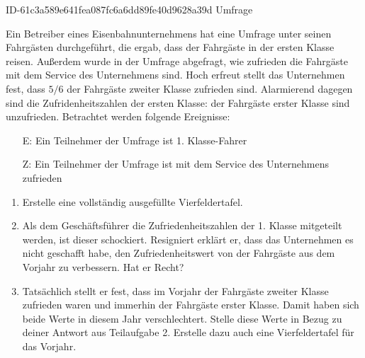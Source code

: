 \begin{exercise}
      {ID-61c3a589e641fea087fc6a6dd89fe40d9628a39d}
      {Umfrage}
  \ifproblem\problem\par
    Ein Betreiber eines Eisenbahnunternehmens hat eine Umfrage unter
    seinen Fahrgästen durchgeführt, die ergab, dass  der Fahrgäste
    in der ersten Klasse reisen. Außerdem wurde in der Umfrage abgefragt,
    wie zufrieden die Fahrgäste mit dem Service des Unternehmens sind.
    Hoch erfreut stellt das Unternehmen fest, dass $5/6$ der Fahrgäste
    zweiter Klasse zufrieden sind. Alarmierend dagegen sind die
    Zufridenheitszahlen der ersten Klasse:  der Fahrgäste erster
    Klasse sind unzufrieden. Betrachtet werden folgende Ereignisse:
    \begin{itemize}
      \item[E:] \glqq Ein Teilnehmer der Umfrage ist 1. Klasse-Fahrer\grqq
      \item[Z:] \glqq Ein Teilnehmer der Umfrage ist mit dem Service
                des Unternehmens zufrieden\grqq
    \end{itemize}
    \begin{enumerate}
      \item Erstelle eine vollständig ausgefüllte Vierfeldertafel.
      \item Als dem Geschäftsführer die Zufriedenheitszahlen der 1. Klasse
            mitgeteilt werden, ist dieser schockiert. Resigniert erklärt er,
            dass das Unternehmen es nicht geschafft habe, den Zufriedenheitswert
            von  der Fahrgäste aus dem Vorjahr zu verbessern.
            Hat er Recht?
      \item Tatsächlich stellt er fest, dass im Vorjahr  der Fahrgäste
            zweiter Klasse zufrieden waren und immerhin  der Fahrgäste
            erster Klasse. Damit haben sich beide Werte in diesem Jahr
            verschlechtert. Stelle diese Werte in Bezug zu deiner Antwort aus
            Teilaufgabe 2. Erstelle dazu auch eine Vierfeldertafel für das Vorjahr.
    \end{enumerate}
  \fi
\end{exercise}
